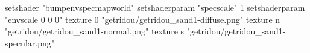 setshader "bumpenvspecmapworld"
setshaderparam "specscale" 1
setshaderparam "envscale 0 0 0"
texture 0 "getridou/getridou_sand1-diffuse.png"
texture n "getridou/getridou_sand1-normal.png"
texture s "getridou/getridou_sand1-specular.png"
